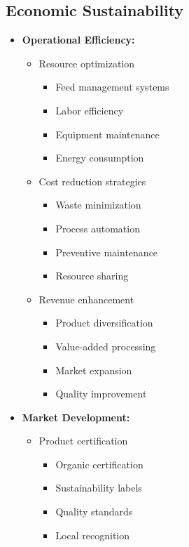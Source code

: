 \subsection{Economic Sustainability}
\begin{itemize}
    \item \textbf{Operational Efficiency:}
    \begin{itemize}
        \item Resource optimization
        \begin{itemize}
            \item Feed management systems
            \item Labor efficiency
            \item Equipment maintenance
            \item Energy consumption
        \end{itemize}
        
        \item Cost reduction strategies
        \begin{itemize}
            \item Waste minimization
            \item Process automation
            \item Preventive maintenance
            \item Resource sharing
        \end{itemize}
        
        \item Revenue enhancement
        \begin{itemize}
            \item Product diversification
            \item Value-added processing
            \item Market expansion
            \item Quality improvement
        \end{itemize}
    \end{itemize}
    
    \item \textbf{Market Development:}
    \begin{itemize}
        \item Product certification
        \begin{itemize}
            \item Organic certification
            \item Sustainability labels
            \item Quality standards
            \item Local recognition
        \end{itemize}
        

\end{itemize}
\end{itemize}
